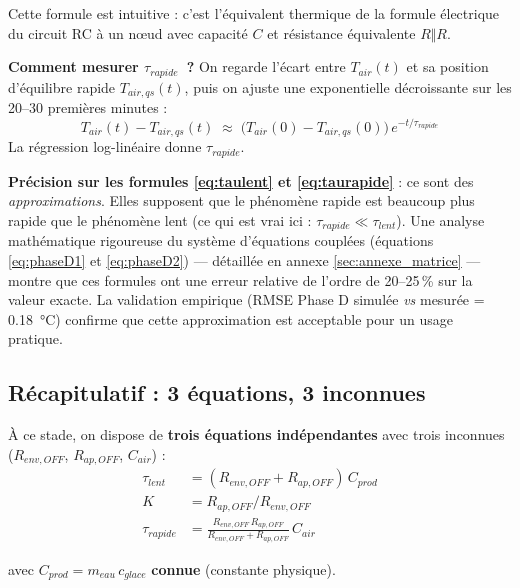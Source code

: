 \documentclass[11pt,a4paper]{article}
\begin{document}
Cette formule est intuitive : c'est l'équivalent thermique de la formule électrique du
circuit RC à un nœud avec capacité $C$ et résistance équivalente $R\Vert R$.

\textbf{Comment mesurer $\tau_{rapide}$~?} On regarde l'écart entre $T_{air}(t)$ et sa
position d'équilibre rapide $T_{air,qs}(t)$, puis on ajuste une exponentielle décroissante
sur les 20--30 premières minutes :
$$T_{air}(t) - T_{air,qs}(t) \;\approx\; \big(T_{air}(0) - T_{air,qs}(0)\big)\,e^{-t/\tau_{rapide}}$$
La régression log-linéaire donne $\tau_{rapide}$.

\begin{honnete}
\textbf{Précision sur les formules \eqref{eq:taulent} et \eqref{eq:taurapide}} : ce sont des
\emph{approximations}. Elles supposent que le phénomène rapide est beaucoup plus rapide que
le phénomène lent (ce qui est vrai ici : $\tau_{rapide} \ll \tau_{lent}$). Une analyse
mathématique rigoureuse du système d'équations couplées (équations \ref{eq:phaseD1}
et \ref{eq:phaseD2}) — détaillée en annexe \ref{sec:annexe_matrice} — montre que ces
formules ont une erreur relative de l'ordre de 20--25\,\% sur la valeur exacte. La validation
empirique (RMSE Phase D simulée \emph{vs} mesurée = \SI{0,18}{\celsius}) confirme que cette
approximation est acceptable pour un usage pratique.
\end{honnete}

\subsection{Récapitulatif : 3 équations, 3 inconnues}

À ce stade, on dispose de \textbf{trois équations indépendantes} avec trois inconnues
($R_{env,OFF}$, $R_{ap,OFF}$, $C_{air}$) :
\begin{align}
\tau_{lent} &= (R_{env,OFF} + R_{ap,OFF})\,C_{prod}\\
K &= R_{ap,OFF}/R_{env,OFF}\\
\tau_{rapide} &= \frac{R_{env,OFF}\,R_{ap,OFF}}{R_{env,OFF}+R_{ap,OFF}}\,C_{air}
\end{align}

avec $C_{prod} = m_{eau}\,c_{glace}$ \textbf{connue} (constante physique).
\end{document}
